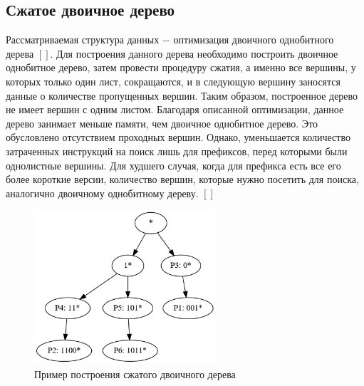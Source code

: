 \documentclass[a4peper, 12pt, titlepage, finall]{report}
\begin{document}
        \subsection{Сжатое двоичное дерево}
            Рассматриваемая структура данных $-$ оптимизация двоичного однобитного дерева $[ ]$. Для построения данного дерева необходимо построить двоичное однобитное дерево, 
            затем провести процедуру сжатия, а именно все вершины, у которых только один лист, сокращаются, и в следующую вершину заносятся данные о 
            количестве пропущенных вершин. Таким образом, построенное дерево не имеет вершин с одним листом. Благодаря описанной оптимизации, данное дерево
            занимает меньше памяти, чем двоичное однобитное дерево. Это обусловлено отсутствием проходных вершин. Однако, уменьшается количество затраченных инструкций на поиск лишь 
            для префиксов, перед которыми были однолистные вершины. Для худшего случая, когда для префикса есть все его более короткие версии, количество вершин, 
            которые нужно посетить для поиска, аналогично двоичному однобитному дереву. $[ ]$

            \begin{figure}[h]
                \centering
                \includegraphics[width=0.6\textwidth]{compressed_binary.png}
                \caption{Пример построения сжатого двоичного дерева}\label{fig:mesh2}
            \end{figure}
\end{document}
